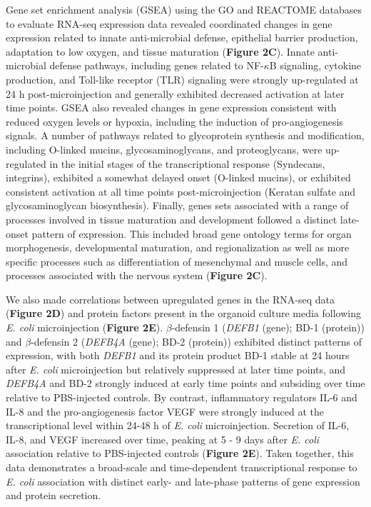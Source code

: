 \documentclass[9pt,lineo]{elife}
\begin{document}
Gene set enrichment analysis (GSEA) \citep{Subramanian:2005} using the GO \citep{Ashburner:2000,Gene_Ontology_Consortium:2015} and REACTOME \citep{Croft:2014,Fabregat:2016} databases to evaluate RNA-seq expression data revealed coordinated changes in gene expression related to innate anti-microbial defense, epithelial barrier production, adaptation to low oxygen, and tissue maturation (\textbf{Figure 2C}). Innate anti-microbial defense pathways, including genes related to NF-\(\kappa\)B signaling, cytokine production, and Toll-like receptor (TLR) signaling were strongly up-regulated at 24 h post-microinjection and generally exhibited decreased activation at later time points. GSEA also revealed changes in gene expression consistent with reduced oxygen levels or hypoxia, including the induction of pro-angiogenesis signals. A number of pathways related to glycoprotein synthesis and modification, including O-linked mucins, glycosaminoglycans, and proteoglycans, were up-regulated in the initial stages of the transcriptional response (Syndecans, integrins), exhibited a somewhat delayed onset (O-linked mucins), or exhibited consistent activation at all time points post-microinjection (Keratan sulfate and glycosaminoglycan biosynthesis). Finally, genes sets associated with a range of processes involved in tissue maturation and development followed a distinct late-onset pattern of expression. This included broad gene ontology terms for organ morphogenesis, developmental maturation, and regionalization as well as more specific processes such as differentiation of mesenchymal and muscle cells, and processes associated with the nervous system (\textbf{Figure 2C}).

We also made correlations between upregulated genes in the RNA-seq data (\textbf{Figure 2D}) and protein factors present in the organoid culture media following \emph{E. coli} microinjection (\textbf{Figure 2E}). \(\beta\)-defensin 1 (\emph{DEFB1} (gene); BD-1 (protein)) and \(\beta\)-defensin 2 (\emph{DEFB4A} (gene); BD-2 (protein)) exhibited distinct patterns of expression, with both \emph{DEFB1} and its protein product BD-1 stable at 24 hours after \emph{E. coli} microinjection but relatively suppressed at later time points, and \emph{DEFB4A} and BD-2 strongly induced at early time points and subsiding over time relative to PBS-injected controls. By contrast, inflammatory regulators IL-6 and IL-8 and the pro-angiogenesis factor VEGF were strongly induced at the transcriptional level within 24-48 h of \emph{E. coli} microinjection. Secretion of IL-6, IL-8, and VEGF increased over time, peaking at 5 - 9 days after \emph{E. coli} association relative to PBS-injected controls (\textbf{Figure 2E}). Taken together, this data demonstrates a broad-scale and time-dependent transcriptional response to \emph{E. coli} association with distinct early- and late-phase patterns of gene expression and protein secretion.
\end{document}
